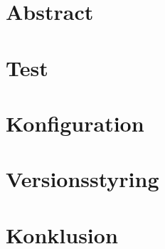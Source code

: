 \documentclass[a4paper]{article}
\author{Mads Sørensen, Bertram Kjær, Lucas Schoubye, Ismail Ali, Mark Nielsen}
\begin{document}
    \maketitle
    \newpage

    \tableofcontents

    \newpage

    \section*{Abstract}

    \newpage

    
    
    
    
    \section{Test}
    \section{Konfiguration}
    \section{Versionsstyring}
    \section{Konklusion}
\end{document}
